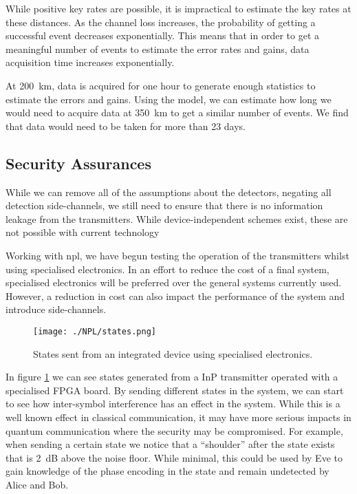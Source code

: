 While positive key rates are possible, it is impractical to estimate the key rates at these distances. As the channel loss increases, the probability of getting a successful event decreases exponentially. This means that in order to get a meaningful number of events to estimate the error rates and gains, data acquisition time increases exponentially. 

At \SI{200}{\km}, data is acquired for one hour to generate enough statistics to estimate the errors and gains. Using the model, we can estimate how long we would need to acquire data at \SI{350}{\km} to get a similar number of events. We find that data would need to be taken for more than 23 days. 

%

\subsection{Security Assurances}

While we can remove all of the assumptions about the detectors, negating all detection side-channels, we still need to ensure that there is no information leakage from the transmitters. While device-independent schemes exist, these are not possible with current technology

Working with \ac{npl}, we have begun testing the operation of the transmitters whilst using specialised electronics. In an effort to reduce the cost of a final system, specialised electronics will be preferred over the general systems currently used. However, a reduction in cost can also impact the performance of the system and introduce side-channels.

\begin{figure}
	\texttt{[image: ./NPL/states.png]}
	\caption{States sent from an integrated device using specialised electronics.}
	\label{fig:npl_states}
\end{figure}

In figure \ref{fig:npl_states} we can see states generated from a \ac{InP} transmitter operated with a specialised FPGA board. By sending different states in the system, we can start to see how inter-symbol interference has an effect in the system. While this is a well known effect in classical communication, it may have more serious impacts in quantum communication where the security may be compromised. For example, when sending a certain state we notice that a ``shoulder'' after the state exists that is \SI{2}{dB} above the noise floor. While minimal, this could be used by Eve to gain knowledge of the phase encoding in the state and remain undetected by Alice and Bob.

